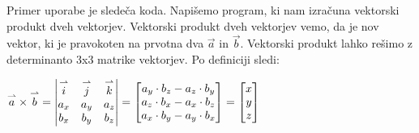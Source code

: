 \documentclass[a4paper, 12pt]{article}
\begin{document}
Primer uporabe  je sledeča koda. Napišemo program, ki nam izračuna vektorski produkt dveh vektorjev. Vektorski produkt dveh vektorjev vemo, da je nov vektor, ki je pravokoten na prvotna dva $\vec{a}$ in $\vec{b}$. Vektorski produkt lahko rešimo z determinanto 3x3 matrike vektorjev. Po definiciji sledi:\\

{\centering
$\overset{\rightharpoonup}{a} \times \overset{\rightharpoonup}{b} =
\begin{vmatrix}
\overset{\rightharpoonup}{i} & \overset{\rightharpoonup}{j} & \overset{\rightharpoonup}{k} \\ 
a_x & a_y & a_z\\ 
b_x & b_y &b_z \notag
\end{vmatrix}=
\begin{bmatrix}
	a_y\cdot b_z - a_z\cdot b_y\\
	a_z\cdot b_x - a_x\cdot b_z\\
	a_x\cdot b_y - a_y\cdot b_x \notag
\end{bmatrix}=
\begin{bmatrix}
	x\\
	y\\
	z \notag
\end{bmatrix}$\par}
\end{document}
